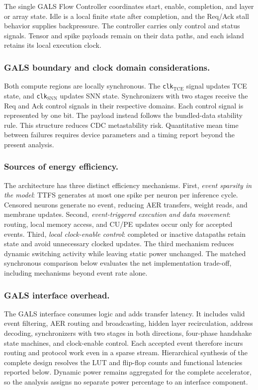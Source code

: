 \documentclass[12pt]{article}
\begin{document}
The single GALS Flow Controller coordinates start, enable, completion, and layer or array state. Idle is a local finite state after completion, and the Req/Ack stall behavior supplies backpressure. The controller carries only control and status signals. Tensor and spike payloads remain on their data paths, and each island retains its local execution clock.

\subsubsection*{GALS boundary and clock domain considerations.}
Both compute regions are locally synchronous. The \texttt{clk}$_{\mathrm{TCE}}$ signal updates TCE state, and \texttt{clk}$_{\mathrm{SNN}}$ updates SNN state. Synchronizers with two stages receive the Req and Ack control signals in their respective domains. Each control signal is represented by one bit. The payload instead follows the bundled-data stability rule. This structure reduces CDC metastability risk. Quantitative mean time between failures requires device parameters and a timing report beyond the present analysis.

\subsubsection*{Sources of energy efficiency.}
The architecture has three distinct efficiency mechanisms. First, \emph{event sparsity in the model}: TTFS generates at most one spike per neuron per inference cycle. Censored neurons generate no event, reducing AER transfers, weight reads, and membrane updates. Second, \emph{event-triggered execution and data movement}: routing, local memory access, and CU/PE updates occur only for accepted events. Third, \emph{local clock-enable control}: completed or inactive datapaths retain state and avoid unnecessary clocked updates. The third mechanism reduces dynamic switching activity while leaving static power unchanged. The matched synchronous comparison below evaluates the net implementation trade-off, including mechanisms beyond event rate alone.

\subsubsection*{GALS interface overhead.}
The GALS interface consumes logic and adds transfer latency. It includes valid event filtering, AER routing and broadcasting, hidden layer recirculation, address decoding, synchronizers with two stages in both directions, four-phase handshake state machines, and clock-enable control. Each accepted event therefore incurs routing and protocol work even in a sparse stream. Hierarchical synthesis of the complete design resolves the LUT and flip-flop counts and functional latencies reported below. Dynamic power remains aggregated for the complete accelerator, so the analysis assigns no separate power percentage to an interface component.
\end{document}
